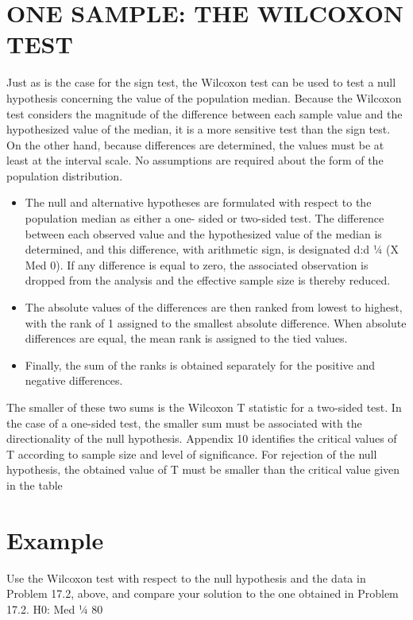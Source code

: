 \section{ONE SAMPLE: THE WILCOXON TEST}
Just as is the case for the sign test, the Wilcoxon test can be used to test a null hypothesis concerning the
value of the population median. Because the Wilcoxon test considers the magnitude of the difference between
each sample value and the hypothesized value of the median, it is a more sensitive test than the sign test. On the
other hand, because differences are determined, the values must be at least at the interval scale. No assumptions
are required about the form of the population distribution.

\begin{itemize}
\item The null and alternative hypotheses are formulated with respect to the population median as either a one-
sided or two-sided test. The difference between each observed value and the hypothesized value of the median
is determined, and this difference, with arithmetic sign, is designated d:d ¼ (X  Med 0). If any difference is
equal to zero, the associated observation is dropped from the analysis and the effective sample size is thereby
reduced. 
\item The absolute values of the differences are then ranked from lowest to highest, with the rank of 1
assigned to the smallest absolute difference. When absolute differences are equal, the mean rank is assigned to
the tied values. \item Finally, the sum of the ranks is obtained separately for the positive and negative differences. 
\end{itemize}

The
smaller of these two sums is the Wilcoxon T statistic for a two-sided test. In the case of a one-sided test, the
smaller sum must be associated with the directionality of the null hypothesis. Appendix 10 identifies the critical
values of T according to sample size and level of significance. For rejection of the null hypothesis, the obtained
value of T must be smaller than the critical value given in the table

\section*{Example}
Use the Wilcoxon test with respect to the null hypothesis and the data in Problem 17.2, above, and
compare your solution to the one obtained in Problem 17.2.
H0: Med ¼ 80

